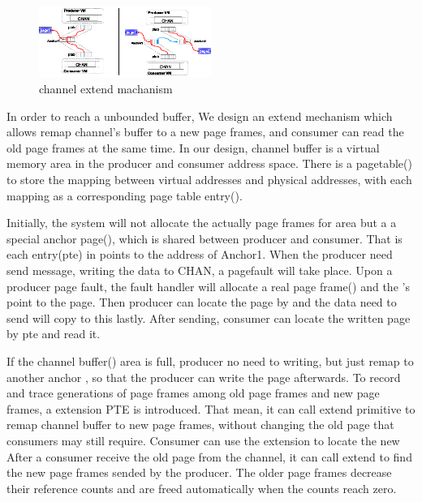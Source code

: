 \begin{figure}[!h!t]  
	\centering
	\includegraphics[width=0.5\textwidth]{eps/chan_extend.eps}
	\caption{channel extend machanism}
	\label{fig:spmckern:extend}
\end{figure}
In order to reach a unbounded buffer,
We design an extend mechanism 
which allows remap channel’s buffer to a new page frames,
and consumer can read the old page frames at the same time.
In our design, channel buffer is a virtual memory area 
in the producer and consumer address space.
There is a pagetable() to store the mapping between virtual addresses and physical addresses, with each mapping as a corresponding page table entry().

Initially, the system will not allocate the actually page frames for  area but a a special anchor page(),
which is shared between producer and consumer.
That is each entry(pte) in  points to the address of Anchor1.
When the producer need send message, 
writing the data to CHAN, a pagefault will take place.
Upon a producer page fault, the fault handler will allocate a real page frame() and the 's  point to the page. 
Then producer can locate the page by  and the data need to send will copy to this  lastly.
After sending, consumer can locate the written page by pte 
and read it.

If the channel buffer() area is full, 
producer no need to writing, 
but just remap  to another anchor ,
so that the producer can write the page afterwards.
To record and trace generations of page frames among old page frames 
and new page frames, a extension PTE is introduced.
That mean,
it can call extend primitive to remap channel buffer to new page frames,
without changing the old page that consumers may still require. 
Consumer can use the extension  to locate the new
After a consumer receive the old page from the channel, 
it can call extend to find the new page frames sended by the
producer.
The older page frames decrease their reference counts and
are freed automatically when the counts reach zero.







